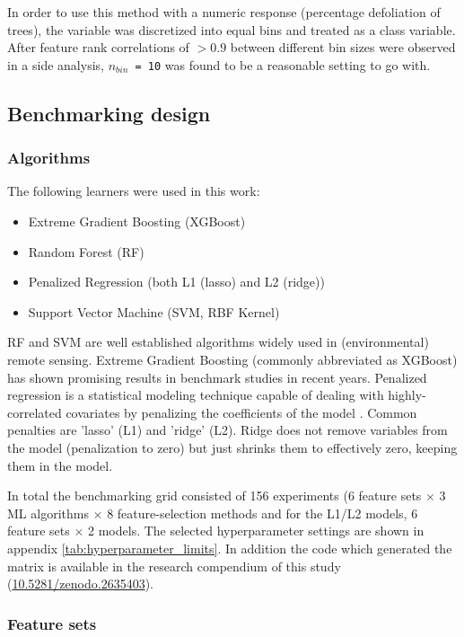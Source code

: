 \documentclass[final]{IEEEtran}
\begin{document}
In order to use this method with a numeric response (percentage defoliation of trees), the variable was discretized into equal bins and treated as a class variable.
After feature rank correlations of $> 0.9$ between different bin sizes were observed in a side analysis, \texttt{\(n_{bin}\) = 10} was found to be a reasonable setting to go with.

\subsection{Benchmarking design}

\subsubsection{Algorithms}

The following learners were used in this work:

\begin{itemize}
	\item  Extreme Gradient Boosting (XGBoost)
	\item  Random Forest (RF)
	\item  Penalized Regression (both L1 (lasso) and L2 (ridge))
	\item  Support Vector Machine (SVM, RBF Kernel)
\end{itemize}

RF and SVM are well established algorithms widely used in (environmental) remote sensing.
Extreme Gradient Boosting (commonly abbreviated as XGBoost) has shown promising results in benchmark studies in recent years.
Penalized regression is a statistical modeling technique capable of dealing with highly-correlated covariates by penalizing the coefficients of the model \cite{hastie2001}.
Common penalties are 'lasso' (L1) and 'ridge' (L2).
Ridge does not remove variables from the model (penalization to zero) but just shrinks them to effectively zero, keeping them in the model.

In total the benchmarking grid consisted of 156 experiments (6 feature sets $\times$ 3 ML algorithms $\times$ 8 feature-selection methods and for the L1/L2 models, 6 feature sets $\times$ 2 models.
The selected hyperparameter settings are shown in appendix \autoref{tab:hyperparameter_limits}.
In addition the code which generated the matrix is available in the research compendium of this study (\url{10.5281/zenodo.2635403}).

\subsubsection{Feature sets}
\end{document}
